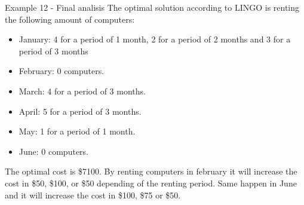\begin{frame}{Example 12 - Final analisis}
\footnotesize
The optimal solution according to LINGO is renting the following amount of computers:
\begin{itemize}
\item{January: 4 for a period of 1 month, 2 for a period of 2 months and 3 for a period of 3 months\\}
\item{February: 0 computers.\\}
\item{March: 4 for a period of 3 months.\\}
\item{April: 5 for a period of 3 months.\\}
\item{May: 1 for a period of  1 month.\\}
\item{June: 0 computers.\\}
\end{itemize}
The optimal cost is \$7100. By renting computers in february it will increase the cost in \$50, \$100, or \$50
depending of the renting period. Same happen in June and it will increase the cost in \$100, \$75 or \$50.
\end{frame}
